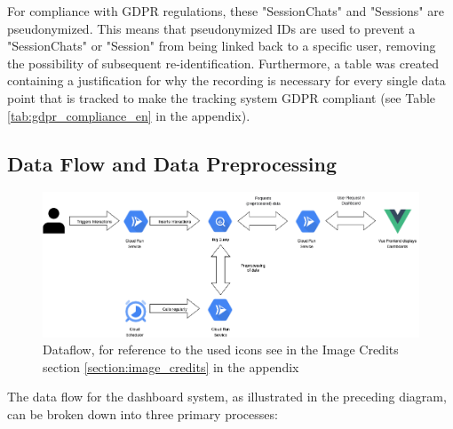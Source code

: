 \documentclass[
	english,
	ruledheaders=section,%
	class=report,%
	thesis={type=bachelor},%
	accentcolor=1b,%
	custommargins=true,%
	marginpar=false,%
	parskip=half-,%
	fontsize=11pt,%
	DIV=14,
]{tudapub}
\begin{document}
For compliance with GDPR \parencite{GDPR_2016} regulations, these "SessionChats" and "Sessions" are pseudonymized. This means that pseudonymized IDs are used to prevent a "SessionChats" or "Session" from being linked back to a specific user, removing the possibility of subsequent re-identification. Furthermore, a table was created containing a justification for why the recording is necessary for every single data point that is tracked to make the tracking system GDPR compliant (see Table \ref{tab:gdpr_compliance_en} in the appendix).
\newpage
\subsection{Data Flow and Data Preprocessing}
\begin{figure}
    \centering
    \includegraphics[width=1\linewidth]{images/DataFlow_Bachelorthesis.drawio.png}
    \caption{Dataflow, for reference to the used icons see in the Image Credits section \ref{section:image_credits} in the appendix}
    \label{fig:enter-label}
\end{figure}

The data flow for the dashboard system, as illustrated in the preceding diagram, can be broken down into three primary processes:
\end{document}

